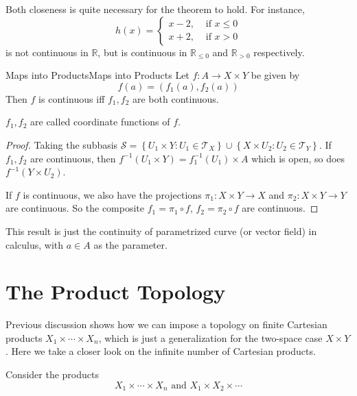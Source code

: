 \documentclass[../main.tex]{subfiles}
\begin{document}
\begin{remark}
Both closeness is quite necessary for the theorem to hold. For instance,
\begin{equation*}
h(x) = 
\begin{cases}
	x-2, &\text{ if } x \leq 0\\
	x+2, & \text{ if } x>0
\end{cases}
\end{equation*}
is not continuous in $\mathbb{R}$, but is continuous in $\mathbb{R}_{\leq 0}$ and $\mathbb{R}_{>0}$ respectively.
\end{remark}

\begin{theorem}{Maps into Products}{Maps into Products}
Let $f: A \rightarrow X \times Y$ be given by
\begin{equation*}
f(a) = (f_1(a),f_2(a))
\end{equation*}
Then $f$ is continuous iff $f_1,f_2$ are both continuous.

$f_1,f_2$ are called coordinate functions of $f$.
\end{theorem}

\begin{proof}
Taking the subbasis $\mathcal{S} = \left\{ U_1 \times Y :U_1\in \mathcal{T}_X \right\}\cup \left\{ X \times U_2: U_2\in \mathcal{T}_Y \right\}$. If $f_1,f_2$ are continuous, then $f^{-1}(U_1 \times Y) = f_1^{-1}(U_1) \times A$ which is open, so does $f^{-1}(Y \times U_2)$.

If $f$ is continuous, we also have the projections $\pi_1: X \times Y \rightarrow X$ and $\pi_2: X \times Y \rightarrow  Y$ are continuous. So the composite $f_1 = \pi_1\circ f$, $f_2 = \pi_2\circ f$ are continuous.
\end{proof}

This result is just the continuity of parametrized curve (or vector field) in calculus, with $a\in A$ as the parameter.

\section{The Product Topology}
Previous discussion shows how we can impose a topology on finite Cartesian products $X_1 \times \cdots \times X_n$, which is just a generalization for the two-space case $X \times Y$. Here we take a closer look on the infinite number of Cartesian products.

Consider the products
\begin{equation*}
X_1 \times \cdots \times X_n \text{ and } X_1 \times X_2 \times \cdots 
\end{equation*}
\end{document}
